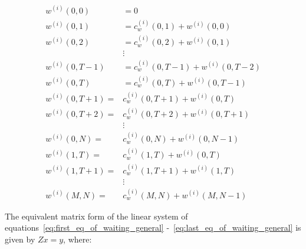 \begin{align}
    w^{(i)}(0, 0) &= 0 \label{eq:first_eq_of_waiting_general} \\
    w^{(i)}(0, 1) &= c^{(i)}_w(0,1) + w^{(i)}(0,0) \\
    w^{(i)}(0, 2) &= c^{(i)}_w(0,2) + w^{(i)}(0,1) \\
    & \vdots \nonumber \\
    w^{(i)}(0, T-1) &= c^{(i)}_w(0,T-1) + w^{(i)}(0,T-2) \\
    w^{(i)}(0, T) &= c^{(i)}_w(0, T) + w^{(i)}(0, T - 1) \\
    w^{(i)}(0, T + 1) =& c^{(i)}_w(0, T + 1) + w^{(i)}(0, T) \\
    w^{(i)}(0, T + 2) =& c^{(i)}_w(0, T + 2) + w^{(i)}(0, T + 1) \\
    & \vdots \nonumber \\
    w^{(i)}(0, N) =& c^{(i)}_w(0, N) + w^{(i)}(0, N - 1) \\
    w^{(i)}(1, T) =& c^{(i)}_w(1, T) + w^{(i)}(0, T) \\
    w^{(i)}(1, T + 1) =& c^{(i)}_w(1, T + 1) + w^{(i)}(1, T) \\
    & \vdots \nonumber \\
    w^{(i)}(M, N) =& c^{(i)}_w(M, N) + w^{(i)}(M, N-1)
    \label{eq:last_eq_of_waiting_general}
\end{align}

The equivalent matrix form of the linear system of
equations~\eqref{eq:first_eq_of_waiting_general}
-~\eqref{eq:last_eq_of_waiting_general}
is given by \(Zx=y\), where:

\newcommand{\allthedots}{\vdots & \vdots & \vdots & \ddots & \vdots & \vdots &
\vdots & \vdots & \ddots & \vdots & \vdots & \vdots & \ddots & \vdots}

